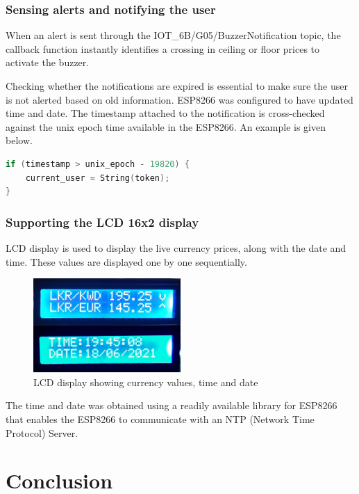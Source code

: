 \subsubsection{Sensing alerts and notifying the user}

When an alert is sent through the IOT\_6B/G05/BuzzerNotification topic, the callback function instantly identifies a crossing in ceiling or floor prices to activate the buzzer. 

Checking whether the notifications are expired is essential to make sure the user is not alerted based on old information. ESP8266 was configured to have updated time and date. The timestamp attached to the notification is cross-checked against the unix epoch time available in the ESP8266. An example is given below.\\

\begin{lstlisting}[language=C++]
if (timestamp > unix_epoch - 19820) {
    current_user = String(token);
}
\end{lstlisting}

\subsubsection{Supporting the LCD 16x2 display}

LCD display is used to display the live currency prices, along with the date and time. These values are displayed one by one sequentially.


\begin{figure}[h]
    \centering
      \includegraphics[width=0.5\textwidth]{images/lcd.jpg}
    \caption{LCD display showing currency values, time and date}
    \label{lcd}
\end{figure}



The time and date was obtained using a readily available library for ESP8266 that enables the ESP8266 to communicate with an NTP (Network Time Protocol) Server.


\section{Conclusion}

